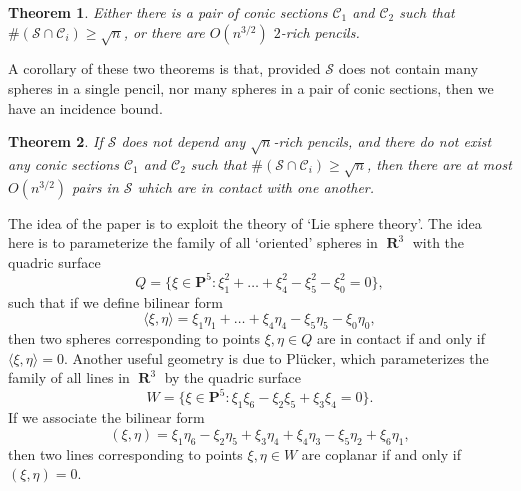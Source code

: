 \documentclass[openany,nobib,nols,a4paper,twoside,symmetric,justified,notoc]{tufte-book}
\theoremstyle{plain}
\newtheorem{theorem}{Theorem}[chapter]
\theoremstyle{remark}
\theoremstyle{definition}
\DeclareMathOperator{\RR}{\mathbf{R}}
\begin{document}
\begin{theorem}
    Either there is a pair of conic sections $\mathcal{C}_1$ and $\mathcal{C}_2$ such that $\#(\mathcal{S} \cap \mathcal{C}_i) \geq \sqrt{n}$, or there are $O(n^{3/2})$ $2$-rich pencils.
\end{theorem}

A corollary of these two theorems is that, provided $\mathcal{S}$ does not contain many spheres in a single pencil, nor many spheres in a pair of conic sections, then we have an incidence bound.

\begin{theorem}
    If $\mathcal{S}$ does not depend any $\sqrt{n}$-rich pencils, and there do not exist any conic sections $\mathcal{C}_1$ and $\mathcal{C}_2$ such that $\#(\mathcal{S} \cap \mathcal{C}_i) \geq \sqrt{n}$, then there are at most $O(n^{3/2})$ pairs in $\mathcal{S}$ which are in contact with one another.
\end{theorem}

The idea of the paper is to exploit the theory of `Lie sphere theory'. The idea here is to parameterize the family of all `oriented' spheres in $\RR^3$ with the quadric surface
%
\[ Q = \{ \xi \in \mathbf{P}^5: \xi_1^2 + \dots + \xi_4^2 - \xi_5^2 - \xi_0^2 = 0 \}, \]
%
such that if we define bilinear form
%
\[ \langle \xi, \eta \rangle = \xi_1 \eta_1 + \dots + \xi_4 \eta_4 - \xi_5 \eta_5 - \xi_0 \eta_0, \]
%
then two spheres corresponding to points $\xi,\eta \in Q$ are in contact if and only if $\langle \xi, \eta \rangle = 0$. Another useful geometry is due to Pl\"{u}cker, which parameterizes the family of all lines in $\RR^3$ by the quadric surface
%
\[ W = \{ \xi \in \mathbf{P}^5: \xi_1\xi_6 - \xi_2\xi_5 + \xi_3\xi_4 = 0 \}. \]
%
If we associate the bilinear form
%
\[ (\xi,\eta) = \xi_1\eta_6 - \xi_2\eta_5 + \xi_3\eta_4 + \xi_4\eta_3 - \xi_5\eta_2 + \xi_6 \eta_1, \]
%
then two lines corresponding to points $\xi,\eta \in W$ are coplanar if and only if $(\xi,\eta) = 0$.
\end{document}
